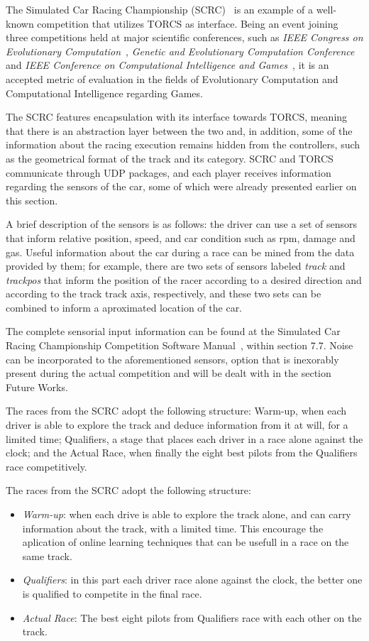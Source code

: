 	The Simulated Car Racing Championship (SCRC)~\cite{SCRC} is an example of a well-known competition that utilizes
	TORCS as interface. Being an event joining three competitions held at major scientific conferences, such as
	\emph{IEEE Congress on Evolutionary Computation}~\cite{CEC}, \emph{Genetic and Evolutionary Computation
	Conference}~\cite{GECCO} and \emph{IEEE Conference on Computational Intelligence and Games}~\cite{CIG}, it is
	an accepted	metric of evaluation in the fields of Evolutionary Computation and Computational Intelligence
	regarding Games.
	
	The SCRC features encapsulation with its interface towards TORCS, meaning that there is an abstraction layer
	between the two and, in addition, some of the information about the racing execution remains hidden from the
	controllers, such as the geometrical format of the track and its category. SCRC and TORCS communicate through
	UDP packages, and each player receives information regarding the sensors of the car, some of which were already
	presented earlier on this section.
	
	A brief description of the sensors is as follows: the driver can use a set of sensors that inform relative
	position, speed, and car condition such as rpm, damage and gas. Useful information about the car during a
	race can be mined from the data provided by them; for example, there are two sets of sensors labeled
	\emph{track} and \emph{trackpos} that inform the position of the racer according to a desired direction and
	according to the track track axis, respectively, and these two sets can be combined to inform a aproximated
	location of the car.
	
	The complete sensorial input information can be found at the Simulated Car Racing Championship Competition
	Software Manual~\cite{SCRC}, within section 7.7. Noise can be incorporated to the aforementioned sensors,
	option that is inexorably present during the actual competition and will be dealt with in the section Future
	Works.
	
	The races from the SCRC adopt the following structure: Warm-up, when each driver is able to explore the track
	and deduce information from it at will, for a limited time; Qualifiers, a stage that places each driver in a
	race alone against the clock; and the Actual Race, when finally the eight best pilots from the Qualifiers race
	competitively.


	The races from the SCRC adopt the following structure:
		\begin{itemize}
			\item \emph{Warm-up}: when each drive is able to explore the track alone, and can carry information about the track, with a limited time. This encourage the aplication of online learning techniques that can be usefull in a race on the same track.
			\item \emph{Qualifiers}: in this part each driver race alone against the clock, the better one is qualified to competite in the final race.
			\item \emph{Actual Race}: The best eight pilots from Qualifiers race with each other on the track.
		\end{itemize}